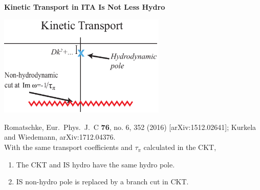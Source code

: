 \documentclass[9pt,a4paper,unknownkeysallowed,xcolor=dvipsnames,aspectratio=43]{beamer}
\begin{document}
\begin{frame}{\bf\huge Kinetic Transport in ITA Is Not Less Hydro}
\vspace{2mm}
\begin{center}
\includegraphics[width=0.6\textwidth]{fig/omega_RTA}
\end{center}
{\tiny  {\color{teablue} Romatschke,
  Eur.\ Phys.\ J.\ C {\bf 76}, no. 6, 352 (2016)
  [arXiv:1512.02641]; Kurkela and Wiedemann,
  arXiv:1712.04376.
  }
  }\vspace{4mm}\\
{{With the same transport coefficients and $\tau_\pi$ calculated in the CKT,}}
\vspace{4mm}
\begin{enumerate}
\item {The CKT and IS hydro have the same hydro pole.}
\vspace{4mm}
\item {\color{darkred}IS non-hydro pole is replaced by a branch cut in CKT.}
\end{enumerate}
\end{frame}
%
%
%
\end{document}
